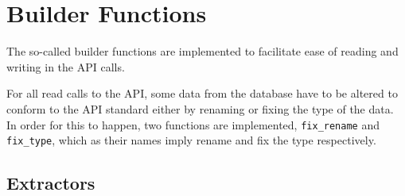 \section{Builder Functions}
The so-called builder functions are implemented to facilitate ease of reading and writing in the API calls.

For all read calls to the API, some data from the database have to be altered to conform to the API standard either by renaming or fixing the type of the data. In order for this to happen, two functions are implemented,  \lstinline|fix_rename| and  \lstinline|fix_type|, which as their names imply rename and fix the type respectively. 

\subsection{Extractors}
